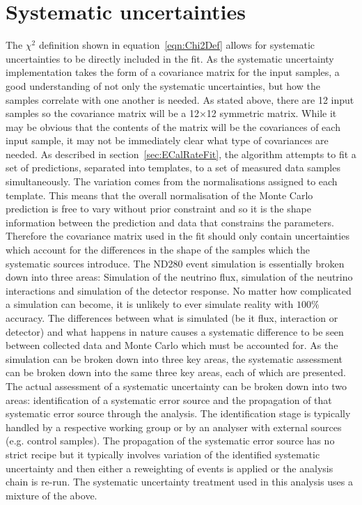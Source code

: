 \section{Systematic uncertainties}
\label{sec:SystematicUncertainties}
The $\chi^2$ definition shown in equation~\ref{eqn:Chi2Def} allows for systematic uncertainties to be directly included in the fit.  As the systematic uncertainty implementation takes the form of a covariance matrix for the input samples, a good understanding of not only the systematic uncertainties, but how the samples correlate with one another is needed.  
\newline
\newline
As stated above, there are 12 input samples so the covariance matrix will be a 12$\times$12 symmetric matrix.  While it may be obvious that the contents of the matrix will be the covariances of each input sample, it may not be immediately clear what type of covariances are needed.  As described in section~\ref{sec:ECalRateFit}, the algorithm attempts to fit a set of predictions, separated into templates, to a set of measured data samples simultaneously.  The variation comes from the normalisations assigned to each template.  This means that the overall normalisation of the Monte Carlo prediction is free to vary without prior constraint and so it is the shape information between the prediction and data that constrains the parameters.  Therefore the covariance matrix used in the fit should only contain uncertainties which account for the differences in the shape of the samples which the systematic sources introduce.
\newline
\newline
The ND280 event simulation is essentially broken down into three areas: Simulation of the neutrino flux, simulation of the neutrino interactions and simulation of the detector response.  No matter how complicated a simulation can become, it is unlikely to ever simulate reality with $100\%$ accuracy.  The differences between what is simulated (be it flux, interaction or detector) and what happens in nature causes a systematic difference to be seen between collected data and Monte Carlo which must be accounted for.  As the simulation can be broken down into three key areas, the systematic assessment can be broken down into the same three key areas, each of which are presented.  
\newline
\newline
The actual assessment of a systematic uncertainty can be broken down into two areas: identification of a systematic error source and the propagation of that systematic error source through the analysis.  The identification stage is typically handled by a respective working group or by an analyser with external sources (e.g. control samples).  The propagation of the systematic error source has no strict recipe but it typically involves variation of the identified systematic uncertainty and then either a reweighting of events is applied or the analysis chain is re-run.  The systematic uncertainty treatment used in this analysis uses a mixture of the above.
